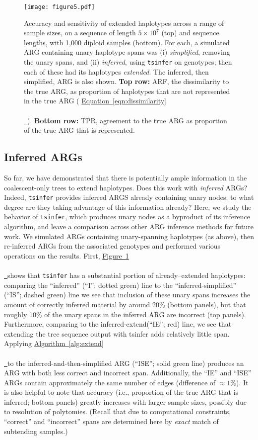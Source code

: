 \documentclass[10pt,twoside,lineno]{gsajnl}
\newcommand{\tsinfer}{\texttt{tsinfer}}
\newcommand{\algorithmref}[2][]{%
	\hyperref[{#2}]{%
		Algorithm~\ref*{#2}%
		\ifx\\#1\\%
		\else
		\,#1%
		\fi
	}%
}
\newcommand*{\figref}[2][]{%
	\hyperref[{#2}]{%
		Figure~\ref*{#2}%
		\ifx\\#1\\%
		\else
		\,#1%
		\fi
	}%
}
\newcommand*{\eqnref}[2][]{%
	\hyperref[{#2}]{%
		Equation~\ref*{#2}%
		\ifx\\#1\\%
		\else
		\,#1%
		\fi
	}%
}
\begin{document}
\begin{figure}[!hbt]
	\begin{center}
        \texttt{[image: figure5.pdf]}
	\end{center}
    \caption{
        Accuracy and sensitivity of extended haplotypes
        across a range of sample sizes, on a sequence of length $5\times10^7$ (top)
        and sequence lengths, with 1,000 diploid samples (bottom).
        For each, a simulated ARG containing unary haplotype spans
        was (i) \emph{simplified}, removing the unary spans,
        and (ii) \emph{inferred}, using \tsinfer{} on genotypes;
        then each of these had its haplotypes \emph{extended}.
        The inferred, then simplified, ARG is also shown.
        \textbf{Top row:} ARF, the dissimilarity to the true ARG,
        as proportion of haplotypes that are not represented in the true ARG
        (\eqnref{eqn:dissimilarity}).
        \textbf{Bottom row:} TPR, agreement to the true ARG
        as proportion of the true ARG that is represented.
        }     
    \label{fig:dissimilarity}
\end{figure}


\subsection{Inferred ARGs}

So far, we have demonstrated that there is potentially ample information
in the coalescent-only trees to extend haplotypes.
Does this work with \emph{inferred} ARGs?
Indeed, \tsinfer{} provides inferred ARGS already containing unary nodes;
to what degree are they taking advantage of this information already?
Here, we study the behavior of \tsinfer{}, which produces unary nodes as a
byproduct of its inference algorithm,
and leave a comparison across other ARG inference methods for future work.
We simulated ARGs containing unary-spanning haplotypes (as above), then
re-inferred ARGs from the associated genotypes and performed various operations
on the results.
First, \figref{fig:dissimilarity} shows that \tsinfer{}
has a substantial portion of already--extended haplotypes:
comparing the ``inferred'' (``I''; dotted green) line to the ``inferred-simplified'' (``IS''; dashed green) line
we see that inclusion of these unary spans increases the amount of correctly inferred material
by around 20\% (bottom panels),
but that roughly 10\% of the unary spans in the inferred ARG are incorrect (top panels).
Furthermore, comparing to the inferred-extend(``IE''; red) line, we see that extending the tree sequence output with tsinfer adds relatively little span.
Applying \algorithmref{alg:extend} to the inferred-and-then-simplified ARG
(``ISE''; solid green line)
produces an ARG with both less correct and incorrect span.
Additionally, the ``IE'' and ``ISE'' ARGs 
contain approximately the same number of edges (difference of $\approx 1\%$).
It is also helpful to note that accuracy
(i.e., proportion of the true ARG that is inferred; bottom panels)
greatly increases with larger sample sizes,
possibly due to resolution of polytomies.
(Recall that due to computational constraints,
``correct'' and ``incorrect'' spans are determined here by \emph{exact} match
of subtending samples.)
\end{document}
